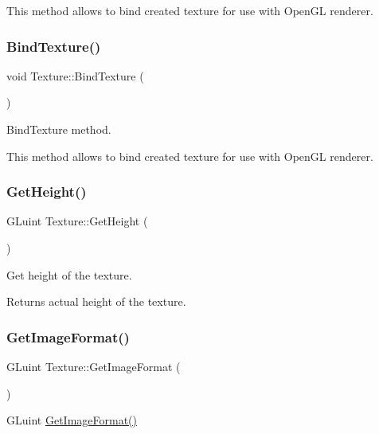 This method allows to bind created texture for use with Open\+GL renderer. \mbox{\label{class_texture_a23465d14b76deef9cf22c14a97040f52}} 
\subsubsection{\texorpdfstring{BindTexture()}{BindTexture()}}
{\footnotesize\ttfamily void Texture\+::\+Bind\+Texture (\begin{DoxyParamCaption}{ }\end{DoxyParamCaption})}



Bind\+Texture method. 

This method allows to bind created texture for use with Open\+GL renderer. \mbox{\label{class_texture_a9313d6712c3af10b467db3b7c3d5a230}} 
\subsubsection{\texorpdfstring{GetHeight()}{GetHeight()}}
{\footnotesize\ttfamily G\+Luint Texture\+::\+Get\+Height (\begin{DoxyParamCaption}{ }\end{DoxyParamCaption})}



Get height of the texture. 

Returns actual height of the texture. \mbox{\label{class_texture_afac89e6e43962939aa13a289e2386fd9}} 
\subsubsection{\texorpdfstring{GetImageFormat()}{GetImageFormat()}}
{\footnotesize\ttfamily G\+Luint Texture\+::\+Get\+Image\+Format (\begin{DoxyParamCaption}{ }\end{DoxyParamCaption})}



G\+Luint \mbox{\hyperlink{class_texture_afac89e6e43962939aa13a289e2386fd9}{Get\+Image\+Format()}} 

